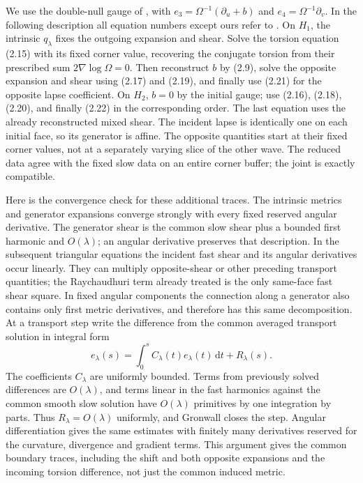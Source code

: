 \documentclass[11pt]{article}
\newcommand{\dd}{\mathrm d}
\begin{document}
We use the double-null gauge of \cite[Eq.~(2.2) and
Def.~2.10]{LR}, with \(e_3=\Omega^{-1}(\partial_u+b)\)
and \(e_4=\Omega^{-1}\partial_v\). In the following description
all equation numbers except ours refer to \cite{LR}.
On \(H_1\), the intrinsic \(q_\lambda\) fixes the outgoing
expansion and shear. Solve the torsion equation (2.15) with
its fixed corner value, recovering the conjugate torsion
from their prescribed sum \(2\nabla\log\Omega=0\). Then
reconstruct \(b\) by (2.9), solve the opposite expansion
and shear using (2.17) and (2.19), and finally use (2.21)
for the opposite lapse coefficient. On \(H_2\), \(b=0\)
by the initial gauge; use (2.16), (2.18), (2.20), and
finally (2.22) in the corresponding order. The last
equation uses the already reconstructed mixed shear.
The incident lapse is identically one on each initial
face, so its generator is affine. The opposite quantities
start at their fixed corner values, not at a separately
varying slice of the other wave. The reduced data agree
with the fixed slow data on an entire corner buffer; the
joint is exactly compatible.

Here is the convergence check for these additional
traces. The intrinsic metrics and generator expansions
converge strongly with every fixed reserved angular
derivative. The generator shear is the common slow
shear plus a bounded first harmonic and \(O(\lambda)\);
an angular derivative preserves that description. In the
subsequent triangular equations the incident fast shear
and its angular derivatives occur linearly. They can
multiply opposite-shear or other preceding transport
quantities; the Raychaudhuri term already treated is
the only same-face fast shear square. In fixed angular
components the connection along a generator also
contains only first metric derivatives, and therefore
has this same decomposition. At a transport step write
the difference from the common averaged transport
solution in integral form
\[
 e_\lambda(s)=\int_0^s C_\lambda(t)e_\lambda(t)\,\dd t+
 R_\lambda(s).
\]
The coefficients \(C_\lambda\) are uniformly bounded.
Terms from previously solved differences are
\(O(\lambda)\), and terms linear in the fast harmonics
against the common smooth slow solution have
\(O(\lambda)\) primitives by one integration by parts.
Thus \(R_\lambda=O(\lambda)\) uniformly, and Gronwall
closes the step. Angular differentiation gives the same
estimates with finitely many derivatives reserved for the
curvature, divergence and gradient terms. This argument
gives the common boundary traces, including the shift
and both opposite expansions and the incoming torsion
difference, not just the common induced metric.
\end{document}

